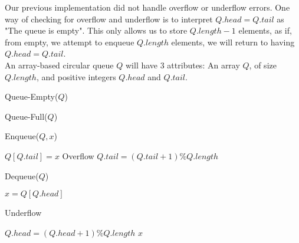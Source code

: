 \documentclass[11pt]{report}
\begin{document}
\begin{impl}
\begin{figure}[H]
    \end{figure}
\end{impl}
\pagebreak
\begin{impl}
    Our previous implementation did not handle overflow or underflow errors. One way of checking for overflow and underflow is to interpret $Q.head = Q.tail$ as "The queue is empty". This only allows us to store $Q.length - 1$ elements, as if, from empty, we attempt to enqueue $Q.length$ elements, we will return to having $Q.head = Q.tail$. \\ An array-based circular queue $Q$ will have 3 attributes: An array $Q$, of size $Q.length$, and positive integers $Q.head$ and $Q.tail$.\mypar
    \begin{algorithm}[H]
        \caption{Queue-Empty($Q$)}
    \end{algorithm}
    \begin{algorithm}[H]
        \caption{Queue-Full($Q$)}
    \end{algorithm}
    \begin{algorithm}[H]
        \caption{Enqueue($Q, x$)}
        $Q[Q.tail] = x$\;
        {
            \Error Overflow\;
        } 
        \Else
        {
            $Q.tail = (Q.tail + 1)\%Q.length$\;
        }
    \end{algorithm}
    \begin{algorithm}[H]
        \caption{Dequeue($Q$)}
        $x = Q[Q.head]$\;
        {
            \Error Underflow\;
            
        }
        \Else
        {
            $Q.head = (Q.head + 1)\%Q.length$\;
        }
        \Return $x$\;
    \end{algorithm}
\end{impl}
\end{document}
